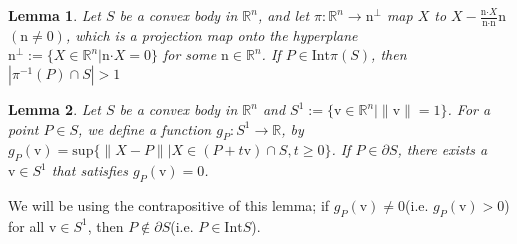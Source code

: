 \documentclass[a4paper]{article}
\newtheorem{lem}{Lemma}[subsection]
\theoremstyle{definition}
\begin{document}
\begin{lem} Let $S$ be a convex body in $\mathbb{R}^n$, and let $\pi:\mathbb{R}^n \rightarrow \boldsymbol{\mathrm{n}}^{\perp}$ map $X$ to $X-\frac{\boldsymbol{\mathrm{n}}\boldsymbol{\cdot}X}{\boldsymbol{\mathrm{n}}\boldsymbol{\cdot}\boldsymbol{\mathrm{n}}}\boldsymbol{\mathrm{n}}$
$(\boldsymbol{\mathrm{n}}\not=\boldsymbol{\mathrm{0}})$, which is a projection map onto the hyperplane $\boldsymbol{\mathrm{n}}^{\perp}:=\{X\in\mathbb{R}^n|\boldsymbol{\mathrm{n}}\boldsymbol{\cdot}X=0\}$ for some $\boldsymbol{\mathrm{n}}\in\mathbb{R}^n$. If $P\in \mathrm{Int}\pi(S)$, then $|\pi^{-1}(P)\cap S|>1$
\end{lem}
\begin{lem}Let $S$ be a convex body in $\mathbb{R}^n$ and $S^1 :=\{\boldsymbol{\mathrm{v}}\in\mathbb{R}^n|\|\boldsymbol{\mathrm{v}}\|=1\}$. For a point $P\in S$, we define a function $g_P:S^1\rightarrow\mathbb{R}$, by $g_P(\boldsymbol{\mathrm{v}})=\mathrm{sup}\{\|X-P\||X\in (P+t\boldsymbol{\mathrm{v}})\cap S,t\ge0\}$. If $P\in\partial S$, there exists a $\boldsymbol{\mathrm{v}}\in S^1$ that satisfies $g_P(\boldsymbol{\mathrm{v}})=0$.
\end{lem}

We will be using the contrapositive of this lemma; if $ g_P(\boldsymbol{\mathrm{v}})\not=0$(i.e. $g_P(\boldsymbol{\mathrm{v}})>0$) for all $\boldsymbol{\mathrm{v}}\in S^1$, then $P\notin \partial S$(i.e. $P\in\mathrm{Int}S$).
\end{document}
